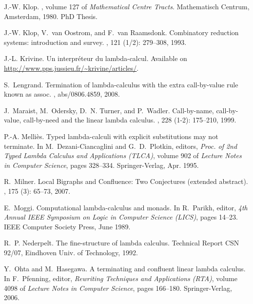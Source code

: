\documentclass{LMCS}
\renewcommand{\>}{\rightarrow}
\begin{document}
\begin{thebibliography}{10}
J.-W. Klop.
, volume 127 of {\em Mathematical
  Centre Tracts}.
\newblock Mathematisch Centrum, Amsterdam, 1980.
\newblock PhD Thesis.

J.-W. Klop, V.~van Oostrom, and F.~van Raamsdonk.
\newblock Combinatory reduction systems: introduction and survey.
, 121 (1/2):
  279--308, 1993.

J.-L. Krivine.
\newblock Un interpr\'eteur du lambda-calcul.
\newblock Available on \url{http://www.pps.jussieu.fr/~krivine/articles/}.

S.~Lengrand.
\newblock Termination of lambda-calculus with the extra call-by-value rule
  known as assoc.
, abs/0806.4859, 2008.

J.~Maraist, M.~Odersky, D.~N. Turner, and P.~Wadler.
\newblock Call-by-name, call-by-value, call-by-need and the linear lambda
  calculus.
, 228 (1-2):
  175--210, 1999.

P.-A. Melli\`es.
\newblock Typed lambda-calculi with explicit substitutions may not terminate.
\newblock In M.~Dezani-Ciancaglini and
               G.~D.~Plotkin, editors, {\em Proc. of 2nd Typed Lambda Calculus and Applications (TLCA)},
  volume 902 of {\em Lecture Notes in Computer Science}, pages 328--334.
  Springer-Verlag, Apr. 1995.

R.~Milner.
\newblock Local {B}igraphs and {C}onfluence: {T}wo {C}onjectures (extended
  abstract).
,
  175 (3): 65--73, 2007.

E.~Moggi.
\newblock Computational lambda-calculus and monads.
\newblock In R.~Parikh, editor, {\em 4th Annual {IEEE} Symposium on Logic in
  Computer Science (LICS)}, pages 14--23. IEEE Computer Society Press, June
  1989.

R.~P. Nederpelt.
\newblock The fine-structure of lambda calculus.
\newblock Technical Report CSN 92/07, Eindhoven Univ. of Technology, 1992.

Y.~Ohta and M.~Hasegawa.
\newblock A terminating and confluent linear lambda calculus.
\newblock In F.~Pfenning, editor, {\em Rewriting Techniques and Applications
  (RTA)}, volume 4098 of {\em Lecture Notes in Computer Science}, pages
  166--180. Springer-Verlag, 2006.


\end{thebibliography}
\end{document}
